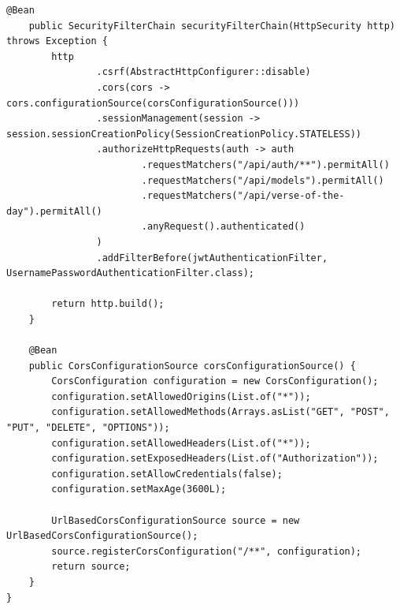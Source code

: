 \begin{lstlisting}[basicstyle=\tiny\ttfamily,breaklines=true]
    @Bean
    public SecurityFilterChain securityFilterChain(HttpSecurity http) throws Exception {
        http
                .csrf(AbstractHttpConfigurer::disable)
                .cors(cors -> cors.configurationSource(corsConfigurationSource()))
                .sessionManagement(session -> session.sessionCreationPolicy(SessionCreationPolicy.STATELESS))
                .authorizeHttpRequests(auth -> auth
                        .requestMatchers("/api/auth/**").permitAll()
                        .requestMatchers("/api/models").permitAll()
                        .requestMatchers("/api/verse-of-the-day").permitAll()
                        .anyRequest().authenticated()
                )
                .addFilterBefore(jwtAuthenticationFilter, UsernamePasswordAuthenticationFilter.class);

        return http.build();
    }

    @Bean
    public CorsConfigurationSource corsConfigurationSource() {
        CorsConfiguration configuration = new CorsConfiguration();
        configuration.setAllowedOrigins(List.of("*"));
        configuration.setAllowedMethods(Arrays.asList("GET", "POST", "PUT", "DELETE", "OPTIONS"));
        configuration.setAllowedHeaders(List.of("*"));
        configuration.setExposedHeaders(List.of("Authorization"));
        configuration.setAllowCredentials(false);
        configuration.setMaxAge(3600L);

        UrlBasedCorsConfigurationSource source = new UrlBasedCorsConfigurationSource();
        source.registerCorsConfiguration("/**", configuration);
        return source;
    }
}
\end{lstlisting}

